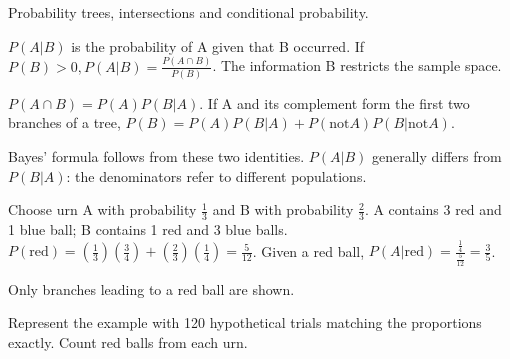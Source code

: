 \documentclass[11pt]{article}
\begin{document}
Probability trees, intersections and conditional probability.\par
{}
\(P(A|B)\) is the probability of A given that B occurred. If \(P(B) > 0, P(A|B) = \frac{P(A \cap  B)}{P(B)}\). The information B restricts the sample space.\par
\(P(A \cap  B) = P(A)P(B|A)\). If A and its complement form the first two branches of a tree, \(P(B) = P(A)P(B|A) + P(\mathrm{not} A)P(B|\mathrm{not} A)\).\par
Bayes’ formula follows from these two identities. \(P(A|B)\) generally differs from \(P(B|A)\): the denominators refer to different populations.\par
{}
Choose urn A with probability \(\frac{1}{3}\) and B with probability \(\frac{2}{3}\). A contains 3 red and 1 blue ball; B contains 1 red and 3 blue balls. \(P(\mathrm{red}) = (\frac{1}{3})(\frac{3}{4}) + (\frac{2}{3})(\frac{1}{4}) = \frac{5}{12}\). Given a red ball, \(P(A|\mathrm{red}) = \frac{\frac{1}{4}}{\frac{5}{12}} = \frac{3}{5}\).\par
\begin{center}\end{center}
Only branches leading to a red ball are shown.\par
{}
Represent the example with 120 hypothetical trials matching the proportions exactly. Count red balls from each urn.\par
\end{document}
